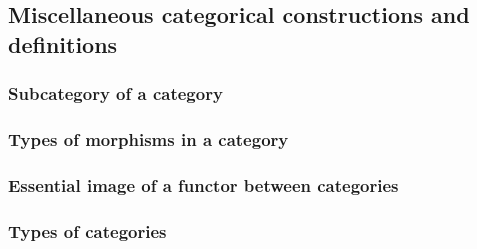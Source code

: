 



\subsection{Miscellaneous categorical constructions and definitions}

\subsubsection{Subcategory of a category}















\subsubsection{Types of morphisms in a category}





\subsubsection{Essential image of a functor between categories}




\subsubsection{Types of categories}




